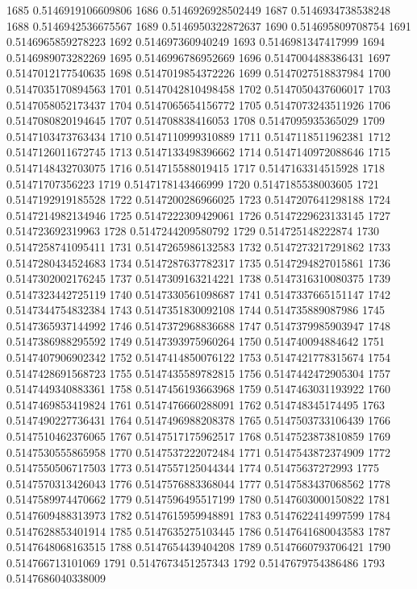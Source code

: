 1685 0.5146919106609806
1686 0.5146926928502449
1687 0.5146934738538248
1688 0.5146942536675567
1689 0.5146950322872637
1690 0.514695809708754
1691 0.5146965859278223
1692 0.514697360940249
1693 0.5146981347417999
1694 0.5146989073282269
1695 0.5146996786952669
1696 0.5147004488386431
1697 0.5147012177540635
1698 0.5147019854372226
1699 0.5147027518837984
1700 0.5147035170894563
1701 0.5147042810498458
1702 0.5147050437606017
1703 0.5147058052173437
1704 0.5147065654156772
1705 0.5147073243511926
1706 0.5147080820194645
1707 0.514708838416053
1708 0.5147095935365029
1709 0.5147103473763434
1710 0.5147110999310889
1711 0.5147118511962381
1712 0.5147126011672745
1713 0.5147133498396662
1714 0.5147140972088646
1715 0.5147148432703075
1716 0.514715588019415
1717 0.5147163314515928
1718 0.51471707356223
1719 0.5147178143466999
1720 0.5147185538003605
1721 0.5147192919185528
1722 0.5147200286966025
1723 0.5147207641298188
1724 0.5147214982134946
1725 0.5147222309429061
1726 0.5147229623133145
1727 0.514723692319963
1728 0.5147244209580792
1729 0.514725148222874
1730 0.5147258741095411
1731 0.5147265986132583
1732 0.5147273217291862
1733 0.5147280434524683
1734 0.5147287637782317
1735 0.5147294827015861
1736 0.5147302002176245
1737 0.5147309163214221
1738 0.5147316310080375
1739 0.5147323442725119
1740 0.5147330561098687
1741 0.5147337665151147
1742 0.5147344754832384
1743 0.5147351830092108
1744 0.514735889087986
1745 0.5147365937144992
1746 0.5147372968836688
1747 0.5147379985903947
1748 0.5147386988295592
1749 0.5147393975960264
1750 0.514740094884642
1751 0.5147407906902342
1752 0.5147414850076122
1753 0.5147421778315674
1754 0.5147428691568723
1755 0.5147435589782815
1756 0.5147442472905304
1757 0.5147449340883361
1758 0.5147456193663968
1759 0.5147463031193922
1760 0.5147469853419824
1761 0.5147476660288091
1762 0.514748345174495
1763 0.5147490227736431
1764 0.5147496988208378
1765 0.5147503733106439
1766 0.5147510462376065
1767 0.5147517175962517
1768 0.5147523873810859
1769 0.5147530555865958
1770 0.5147537222072484
1771 0.5147543872374909
1772 0.5147550506717503
1773 0.5147557125044344
1774 0.51475637272993
1775 0.5147570313426043
1776 0.5147576883368044
1777 0.5147583437068562
1778 0.5147589974470662
1779 0.5147596495517199
1780 0.5147603000150822
1781 0.5147609488313973
1782 0.5147615959948891
1783 0.5147622414997599
1784 0.5147628853401914
1785 0.5147635275103445
1786 0.5147641680043583
1787 0.5147648068163515
1788 0.5147654439404208
1789 0.5147660793706421
1790 0.514766713101069
1791 0.5147673451257343
1792 0.5147679754386486
1793 0.5147686040338009
